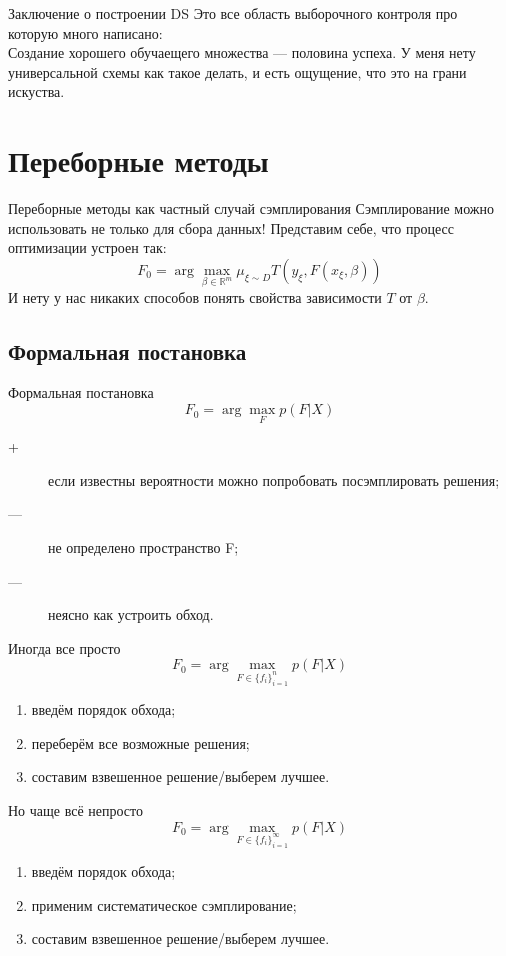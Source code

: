 \documentclass[14pt, fleqn, xcolor={dvipsnames, table}]{beamer}
\begin{document}
\begin{frame}{Заключение о построении DS}
Это все область выборочного контроля про которую много написано:\\

Создание хорошего обучаещего множества --- половина успеха. У меня нету универсальной схемы как такое делать, и есть ощущение, что это на грани искуства.
\end{frame}

\section{Переборные методы}

\begin{frame}{Переборные методы как частный случай сэмплирования}
Сэмплирование можно использовать не только для сбора данных! Представим себе, что процесс оптимизации устроен так:
$$
F_0 = \arg \max_{\beta \in \mathbb{R}^m} \mu_{\xi \sim D} T(y_{\xi}, F(x_{\xi}, \beta))
$$
И нету у нас никаких способов понять свойства зависимости $T$ от $\beta$.
\end{frame}

\subsection{Формальная постановка}
\begin{frame}{Формальная постановка}
$$
F_0 = \arg\max_F p(F|X)
$$
\begin{description}
  \item[\color{green}+] если известны вероятности можно попробовать посэмплировать решения;
  \item[\color{red}---] не определено пространство F;
  \item[\color{red}---] неясно как устроить обход.
\end{description}
\end{frame}

\begin{frame}{Иногда все просто}
$$
F_0 = \arg\max_{F \in \{f_i\}_{i=1}^n} p(F|X)
$$
\begin{enumerate}
  \item введём порядок обхода;
  \item переберём все возможные решения;
  \item составим взвешенное решение/выберем лучшее.
\end{enumerate}
\end{frame}

\begin{frame}{Но чаще всё непросто}
$$
F_0 = \arg\max_{F \in \{f_i\}_{i=1}^\infty} p(F|X)
$$
\begin{enumerate}
  \item введём порядок обхода;
  \item применим систематическое сэмплирование;
  \item составим взвешенное решение/выберем лучшее.
\end{enumerate}
\end{frame}
\end{document}
